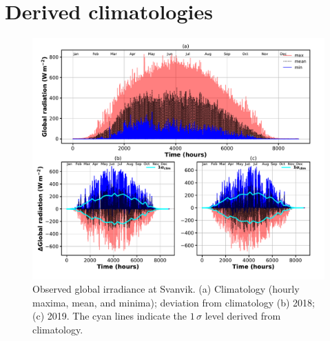 \documentclass[bg, manuscript]{copernicus}
\begin{document}









\clearpage

\appendix
\section{Derived climatologies}    %


\appendixfigures  %
\begin{figure}[t]
  \includegraphics[width=12cm]{figA1}
  \caption{Observed global irradiance at Svanvik. (a) Climatology (hourly maxima, mean, and minima); deviation from climatology (b) 2018; (c) 2019. The cyan lines indicate the $1\,\sigma$ level derived from climatology.}
  \label{fig:global_rad_clim}
\end{figure}
\end{document}
